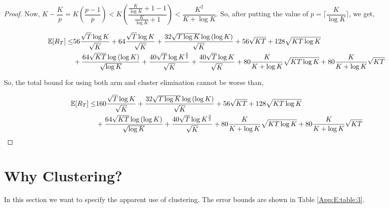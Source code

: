 \begin{proof}
	Now, $K-\dfrac{K}{p}= K\left( \dfrac{p-1}{p} \right) < K\left(  \dfrac{\frac{K}{\log K}+1-1}{\frac{K}{\log K}+1 }\right) < \dfrac{K^2}{K+\log K}$. So, after putting the value of $p=\bigg\lceil \dfrac{K}{\log K} \bigg\rceil$, we get,
	
	\begin{align*}
	\mathbb{E}[R_{T}]\leq & 56\dfrac{\sqrt{T}\log K}{\sqrt{K}} + 64\dfrac{\sqrt{T}\log K}{\sqrt{K}} + \dfrac{32\sqrt{T\log K}\log{(\log K)}}{\sqrt{K}} + 56\sqrt{KT} + 128\sqrt{KT\log K}\\
	& + \dfrac{64\sqrt{KT}\log{(\log K)}}{\sqrt{\log K}} + \dfrac{40 \sqrt{T}\log K^{\frac{3}{2}} }{\sqrt{K}} + \dfrac{40 \sqrt{T}\log K}{\sqrt{K}} + 80 \dfrac{K}{K+\log K}\sqrt{KT\log K} + 80 \dfrac{K}{K+\log K}\sqrt{KT}\\ 
	\end{align*}
 	
	So, the total bound for using both arm and cluster elimination cannot be worse than,
	
	\begin{align*}
	\mathbb{E}[R_{T}]\leq & 160\dfrac{\sqrt{T}\log K}{\sqrt{K}} + \dfrac{32\sqrt{T\log K}\log{(\log K)}}{\sqrt{K}} + 56\sqrt{KT} + 128\sqrt{KT\log K}\\
	& + \dfrac{64\sqrt{KT}\log{(\log K)}}{\sqrt{\log K}} + \dfrac{40 \sqrt{T}\log K^{\frac{3}{2}} }{\sqrt{K}} + 80 \dfrac{K}{K+\log K}\sqrt{KT\log K} + 80 \dfrac{K}{K+\log K}\sqrt{KT}\\ 
	\end{align*}		
\end{proof}

\section{Why Clustering?}
\label{App:E}

In this section we want to specify the apparent use of clustering. The error bounds are shown in Table \ref{App:E:table:3}.


 
